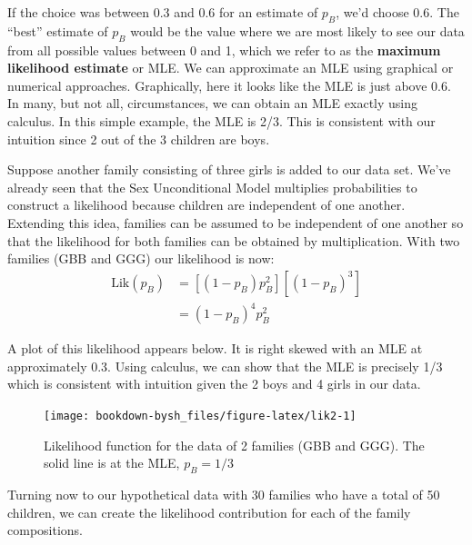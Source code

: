\documentclass[
]{krantz}
\newcommand{\lik}{\mathrm{Lik}}
\begin{document}
If the choice was between 0.3 and 0.6 for an estimate of \(p_B\), we'd choose 0.6. The ``best'' estimate of \(p_B\) would be the value where we are most likely to see our data from all possible values between 0 and 1, which we refer to as the \textbf{maximum likelihood estimate} or MLE. We can approximate an MLE using graphical or numerical approaches. Graphically, here it looks like the MLE is just above 0.6. In many, but not all, circumstances, we can obtain an MLE exactly using calculus. In this simple example, the MLE is 2/3. This is consistent with our intuition since 2 out of the 3 children are boys.

Suppose another family consisting of three girls is added to our data set. We've already seen that the Sex Unconditional Model multiplies probabilities to construct a likelihood because children are independent of one another. Extending this idea, families can be assumed to be independent of one another so that the likelihood for both families can be obtained by multiplication. With two families (GBB and GGG) our likelihood is now:
\begin{align}
 \lik (p_B) &= [(1-p_B)p_B^2][(1-p_B)^3] \\
                    &= (1-p_B)^4p_B^2
\end{align}

A plot of this likelihood appears below. It is right skewed with an MLE at approximately 0.3. Using calculus, we can show that the MLE is precisely 1/3 which is consistent with intuition given the 2 boys and 4 girls in our data.

\begin{figure}

{\centering \texttt{[image: bookdown-bysh\_files/figure-latex/lik2-1]} 

}

\caption{Likelihood function for the data of 2 families (GBB and GGG). The solid line is at the MLE,  ${p}_B=1/3$}\label{fig:lik2}
\end{figure}

Turning now to our hypothetical data with 30 families who have a total of 50 children, we can create the likelihood contribution for each of the family compositions.
\end{document}
